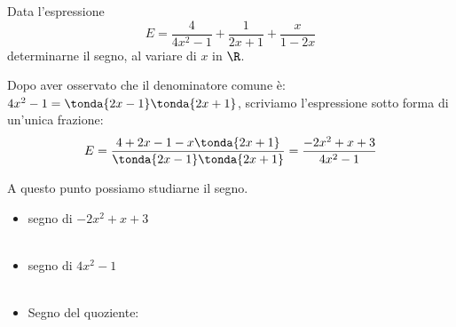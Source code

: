 \begin{esempio}{}{}
Data l'espressione 
\[E = \dfrac{4}{4x^2-1} +\dfrac {1}{2x+1} +\dfrac{x}{1-2x}\]
determinarne il segno, al variare di \(x\) in \(\R\).

Dopo aver osservato che il denominatore comune è:
\(4x^2-1 =\tonda{2x-1}\tonda{2x+1}\), scriviamo 
l'espressione sotto forma di un'unica frazione:
\[E=\dfrac{4+2x-1 - x \tonda{2x+1}}{\tonda{2x-1}\tonda{2x+1}} =
\dfrac{-2x^2+x+3}{4x^2-1}\]

A questo punto possiamo studiarne il segno.
\begin{itemize}[left=0mm]
\item segno di \(-2x^2 +x +3\)\\[-2mm]
\hspace*{-3mm}\\
\hspace*{-3mm}

\item segno di \(4x^2 -1\)\\[-2mm]
\hspace*{-3mm}\\
\hspace*{-3mm}

\item Segno del quoziente: \quad %
\raisebox{-10mm}
{
{\segnofrazioneb}}
\end{itemize}

\end{esempio}

